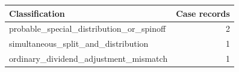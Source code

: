 \begin{tabular}{@{}lr@{}}
\toprule
Classification & Case records \\
\midrule
probable\_\allowbreak{}special\_\allowbreak{}distribution\_\allowbreak{}or\_\allowbreak{}spinoff & 2 \\
simultaneous\_\allowbreak{}split\_\allowbreak{}and\_\allowbreak{}distribution & 1 \\
ordinary\_\allowbreak{}dividend\_\allowbreak{}adjustment\_\allowbreak{}mismatch & 1 \\
\bottomrule
\end{tabular}
